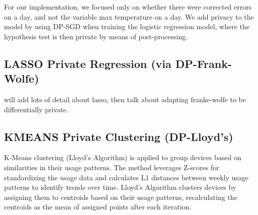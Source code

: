 \documentclass[12pt,letterpaper]{article}
\begin{document}
\begin{table}[h]
For our implementation, we focused only on whether there were corrected errors on a day, and not the variable max temperature on a day.
We add privacy to the model by using DP-SGD when training the logistic regression model, where the hypothesis test is then private by means of post-processing.

\subsection{LASSO Private Regression (via DP-Frank-Wolfe)}

will add lots of detail about lasso, then talk about adapting franke-wolfe to be differentially private. 







\subsection{KMEANS Private Clustering (DP-Lloyd's)}
K-Means clustering (Lloyd's Algorithm) is applied to group devices based on similarities in their usage patterns. The method leverages Z-scores for standardizing the usage data and calculates L1 distances between weekly usage patterns to identify trends over time. Lloyd's Algorithm clusters devices by assigning them to centroids based on their usage patterns, recalculating the centroids as the mean of assigned points after each iteration. 


\end{table}
\end{document}
